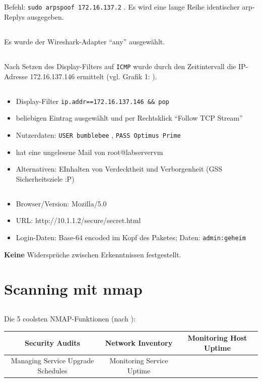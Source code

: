 \documentclass[twoside]{article}
\newcommand{\say}[1]{%
	``#1''%
}
\newcommand{\ttt}[1]{%
	\texttt{#1}%
}
\begin{document}
\subsection{}
Befehl: \ttt{sudo arpspoof 172.16.137.2}.
Es wird eine lange Reihe identischer arp-Replys ausgegeben.
\subsection{}
Es wurde der Wireshark-Adapter ``any'' ausgewählt.
\subsection{}
Nach Setzen des Display-Filters auf \ttt{ICMP} wurde durch den Zeitintervall die IP-Adresse 172.16.137.146 ermittelt (vgl. Grafik 1: ).
\subsection{}
\begin{itemize}
	\item Display-Filter \ttt{ip.addr==172.16.137.146 \&\& pop}
	\item beliebigen Eintrag ausgewählt und per Rechtsklick \say{Follow TCP Stream}
	\item Nutzerdaten: \ttt{USER bumblebee}, \ttt{PASS Optimus Prime}
	\item hat eine ungelesene Mail von root@labservervm
	\item Alternativen: EInhalten von Verdecktheit und Verborgenheit (GSS Sicherheitsziele :P)
\end{itemize}
\subsection{}
	\begin{itemize}
		\item Browser/Version: Mozilla/5.0
		\item URL: http://10.1.1.2/secure/secret.html
		\item Login-Daten: Base-64 encoded im Kopf des Paketes; Daten: \ttt{admin:geheim}
	\end{itemize}
\textbf{Keine }Widersprüche zwischen Erkenntnissen festgestellt.


\section{Scanning mit nmap}
\subsection{}
Die 5 coolsten NMAP-Funktionen (nach \cite{nmap}):\\
\begin{center}\begin{tabular}{|c|c|c|}\hline
	Security Audits	&	Network Inventory	&	Monitoring Host Uptime	\\	\hline
	Managing Service Upgrade Schedules	&	Monitoring Service Uptime&\\\hline
\end{tabular}\end{center}
\end{document}
